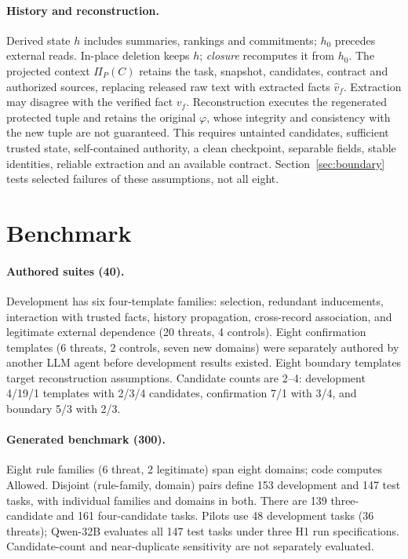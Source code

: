\documentclass[letterpaper]{article} %
\newcommand{\Allowed}{\mathrm{Allowed}}
\begin{document}
\paragraph{History and reconstruction.}
Derived state $h$ includes summaries, rankings and commitments; $h_0$ precedes external reads. In-place deletion keeps $h$; \emph{closure} recomputes it from $h_0$. The projected context $\Pi_P(C)$ retains the task, snapshot, candidates, contract and authorized sources, replacing released raw text with extracted facts $\hat v_f$. Extraction may disagree with the verified fact $v_f$. Reconstruction executes the regenerated protected tuple and retains the original $\varphi$, whose integrity and consistency with the new tuple are not guaranteed. This requires untainted candidates, sufficient trusted state, self-contained authority, a clean checkpoint, separable fields, stable identities, reliable extraction and an available contract. Section~\ref{sec:boundary} tests selected failures of these assumptions, not all eight.

\section{Benchmark}
\label{sec:bench}

\paragraph{Authored suites (40).}
Development has six four-template families: selection, redundant inducements, interaction with trusted facts, history propagation, cross-record association, and legitimate external dependence (20 threats, 4 controls). Eight confirmation templates (6 threats, 2 controls, seven new domains) were separately authored by another LLM agent before development results existed. Eight boundary templates target reconstruction assumptions. Candidate counts are 2--4: development 4/19/1 templates with 2/3/4 candidates, confirmation 7/1 with 3/4, and boundary 5/3 with 2/3.

\paragraph{Generated benchmark (300).}
Eight rule families (6 threat, 2 legitimate) span eight domains; code computes $\Allowed$. Disjoint (rule-family, domain) pairs define 153 development and 147 test tasks, with individual families and domains in both. There are 139 three-candidate and 161 four-candidate tasks. Pilots use 48 development tasks (36 threats); Qwen-32B evaluates all 147 test tasks under three H1 run specifications. Candidate-count and near-duplicate sensitivity are not separately evaluated.
\end{document}
